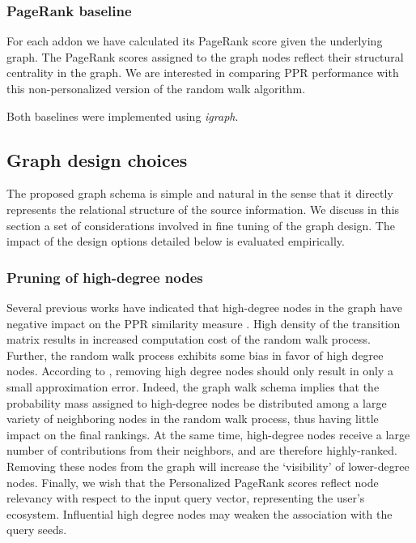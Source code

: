 \documentclass[11pt,oneside]{book}
\let\Oldsubsection\subsection
\renewcommand{\subsection}{\FloatBarrier\Oldsubsection}
\let\Oldsubsubsection\subsubsection
\renewcommand{\subsubsection}{\FloatBarrier\Oldsubsubsection}
\begin{document}
\subsubsection{PageRank baseline} 

For each addon we have calculated its PageRank score given the underlying graph. The PageRank scores assigned to the graph nodes reflect their structural centrality in the graph. We are interested in comparing PPR performance with this non-personalized version of the random walk algorithm.

Both baselines were implemented using {\it igraph}. 

\subsection{Graph design choices}
\label{sec:design}

The proposed graph schema is simple and natural in the sense that it directly represents the relational structure of the source information. We discuss in this section a set of considerations involved in fine tuning of the graph design. The impact of the design options detailed below is evaluated empirically.  

\subsubsection{Pruning of high-degree nodes} 

Several previous works have indicated that high-degree nodes in the graph have negative impact on the PPR similarity measure \citep{tong2006center}. High density of the transition matrix results in increased computation cost of the random walk process. Further, the random walk process exhibits some bias in favor of high degree nodes. According to \citep{sarkar2010fast}, removing high degree nodes should only result in only a small approximation error. Indeed, the graph walk schema implies that the probability mass assigned to high-degree nodes be distributed among a large variety of neighboring nodes in the random walk process, thus having little impact on the final rankings. At the same time, high-degree nodes receive a large number of contributions from their neighbors, and are therefore highly-ranked. Removing these nodes from the graph will increase the `visibility' of lower-degree nodes. Finally, we wish that the Personalized PageRank scores reflect node relevancy with respect to the input query vector, representing the user's ecosystem. Influential high degree nodes may weaken the association with the query seeds.
\end{document}
